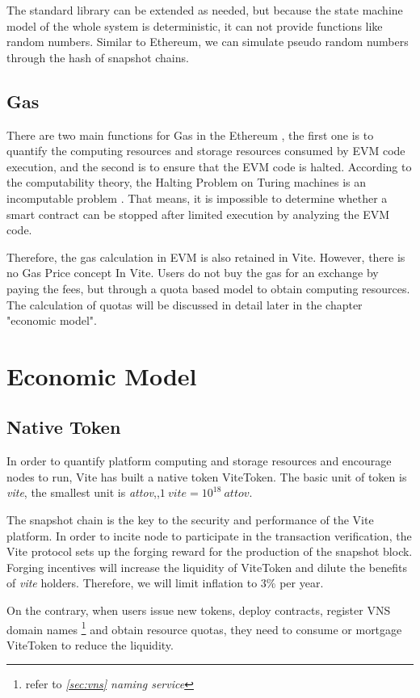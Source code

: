 \documentclass[UTF8,nofonts]{article}
\begin{document}
\begin{multicols}{2}
The standard library can be extended as needed, but because the state machine model of the whole system is deterministic, it can not provide functions like random numbers. Similar to Ethereum, we can simulate pseudo random numbers through the hash of snapshot chains.

\subsection{Gas}
There are two main functions for Gas in the Ethereum , the first one is to quantify the computing resources and storage resources consumed by EVM code execution, and the second is to ensure that the EVM code is halted. According to the computability theory, the Halting Problem on Turing machines is an incomputable problem \cite{haltingproblems}. That means, it is impossible to determine whether a smart contract can be stopped after limited execution by analyzing the EVM code.

Therefore, the gas calculation in EVM is also retained in Vite. However, there is no Gas Price concept In Vite. Users do not buy the gas for an exchange by paying the fees, but through a quota based model to obtain computing resources. The calculation of quotas will be discussed in detail later in the chapter "economic model".

\section{Economic Model}
\subsection{Native Token}
In order to quantify platform computing and storage resources and encourage nodes to run, Vite has built a native token ViteToken. The basic unit of token is \textit{vite}, the smallest unit is \textit{attov},,$1 \: vite = 10^{18} \: attov$.

The snapshot chain is the key to the security and performance of the Vite platform. In order to incite node to participate in the transaction verification, the Vite protocol sets up the forging reward for the production of the snapshot block. Forging incentives will increase the liquidity of ViteToken and dilute the benefits of \textit{vite} holders. Therefore, we will limit inflation to 3\% per year.

On the contrary, when users issue new tokens, deploy contracts, register VNS domain names \footnote{refer to  \textit{\ref{sec:vns} naming service}} and obtain resource quotas, they need to consume or mortgage ViteToken to reduce the liquidity.


\end{multicols}
\end{document}

